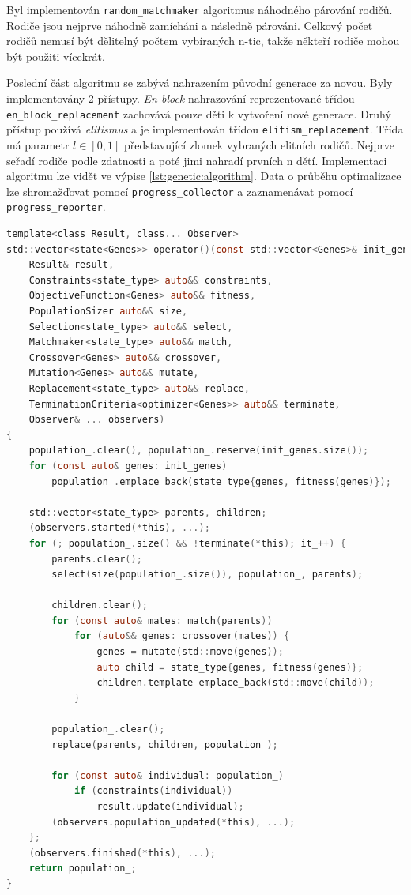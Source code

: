 Byl implementován \texttt{random\_matchmaker} algoritmus náhodného párování rodičů.
Rodiče jsou nejprve náhodně zamícháni a následně párováni.
Celkový počet rodičů nemusí být dělitelný počtem vybíraných n-tic, takže někteří rodiče mohou být použiti vícekrát.

Poslední část algoritmu se zabývá nahrazením původní generace za novou.
Byly implementovány 2 přístupy.
\textit{En block} nahrazování reprezentované třídou \texttt{en\_block\_replacement} zachovává pouze děti k vytvoření nové generace.
Druhý přístup používá \textit{elitismus} a je implementován třídou \texttt{elitism\_replacement}.
Třída má parametr $l\in[0, 1]$ představující zlomek vybraných elitních rodičů.
Nejprve seřadí rodiče podle zdatnosti a poté jimi nahradí prvních n dětí.
Implementaci algoritmu lze vidět ve výpise \ref{lst:genetic:algorithm}.
Data o průběhu optimalizace lze shromažďovat pomocí \texttt{progress\_collector} a zaznamenávat pomocí \texttt{progress\_reporter}.

\begin{lstlisting}[caption={~Implementace genetického algoritmu},label={lst:genetic:algorithm},captionpos=t,abovecaptionskip=-\medskipamount,belowcaptionskip=\medskipamount,language=C]
template<class Result, class... Observer>
std::vector<state<Genes>> operator()(const std::vector<Genes>& init_genes,
    Result& result,
    Constraints<state_type> auto&& constraints,
    ObjectiveFunction<Genes> auto&& fitness,
    PopulationSizer auto&& size,
    Selection<state_type> auto&& select,
    Matchmaker<state_type> auto&& match,
    Crossover<Genes> auto&& crossover,
    Mutation<Genes> auto&& mutate,
    Replacement<state_type> auto&& replace,
    TerminationCriteria<optimizer<Genes>> auto&& terminate,
    Observer& ... observers)
{
    population_.clear(), population_.reserve(init_genes.size());
    for (const auto& genes: init_genes)
        population_.emplace_back(state_type{genes, fitness(genes)});

    std::vector<state_type> parents, children;
    (observers.started(*this), ...);
    for (; population_.size() && !terminate(*this); it_++) {
        parents.clear();
        select(size(population_.size()), population_, parents);

        children.clear();
        for (const auto& mates: match(parents))
            for (auto&& genes: crossover(mates)) {
                genes = mutate(std::move(genes));
                auto child = state_type{genes, fitness(genes)};
                children.template emplace_back(std::move(child));
            }

        population_.clear();
        replace(parents, children, population_);

        for (const auto& individual: population_)
            if (constraints(individual))
                result.update(individual);
        (observers.population_updated(*this), ...);
    };
    (observers.finished(*this), ...);
    return population_;
}
\end{lstlisting}

